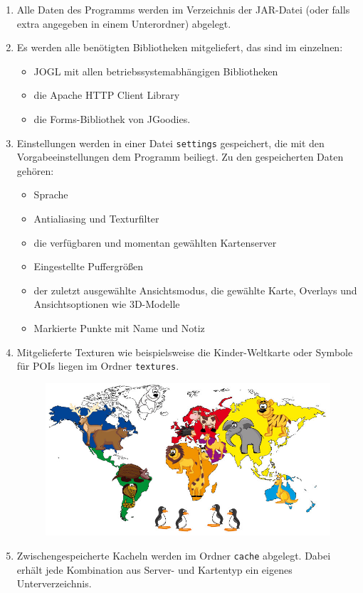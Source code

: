 \documentclass[10pt]{scrreprt}
\newcommand{\ziel}[1]{{\fontsize{9.5}{11}\textsf{/#1/}}}
\newcommand{\ziellabel}{Z}
\newcommand{\muss}{\renewcommand{\labelenumi}{\textbf{\ziel{\ziellabel\numprint{\theenumi}0}}}}
\newcommand{\wunsch}{\renewcommand{\labelenumi}{\textbf{\ziel{\ziellabel\numprint{\theenumi}0W}}}}
\begin{document}
\begin{enumerate}[leftmargin=2cm]
\item Alle Daten des Programms werden im Verzeichnis der JAR-Datei (oder falls extra angegeben in einem Unterordner) abgelegt.
\item Es werden alle benötigten Bibliotheken mitgeliefert, das sind im einzelnen: 
\begin{itemize}
\item JOGL mit allen betriebssystemabhängigen Bibliotheken
\item die Apache HTTP Client Library
\item die Forms-Bibliothek von JGoodies.
\end{itemize}
\wunsch
\item Einstellungen werden in einer Datei \texttt{settings} gespeichert, die mit den Vorgabeeinstellungen dem Programm beiliegt. Zu den gespeicherten Daten gehören:
\begin{itemize}
\item Sprache
\item Antialiasing und Texturfilter
\item die verfügbaren und momentan gewählten Kartenserver
\item Eingestellte Puffergrößen
\item der zuletzt ausgewählte Ansichtsmodus, die gewählte Karte, Overlays und Ansichtsoptionen wie 3D-Modelle
\item Markierte Punkte mit Name und Notiz
\end{itemize}
\muss
\item Mitgelieferte Texturen wie beispielsweise die Kinder-Weltkarte oder Symbole für POIs liegen im Ordner \texttt{textures}.
\begin{figure}[!htb]
	\centering
	\includegraphics[scale=0.3]{Kinder-Weltkarte.jpg}
\end{figure}
\item Zwischengespeicherte Kacheln werden im Ordner \texttt{cache} abgelegt. Dabei erhält jede Kombination aus Server- und Kartentyp ein eigenes Unterverzeichnis.
\end{enumerate}
\end{document}
